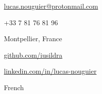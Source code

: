 \begin{TopBar}{\ColorTextSide}
  \vspace{0.35cm}

  \vspace{-0.35cm}
  \begin{multicols}{2}
    \begin{ItemList}{\ColorHighlight}
      \item [\Large\faAt]\href{mailto:lucas.nouguier@protonmail.com}{lucas.nouguier@protonmail.com}
      \item [\Large\faPhone] +33 7 81 76 81 96
      \item [\Large\faHome] Montpellier, France
      \columnbreak%
      \item [\Large\faGithub] \href{https://github.com/iusildra}{github.com/iusildra}
      \item [\Large\faLinkedinIn] \href{https://www.linkedin.com/in/lucas-nouguier/}{linkedin.com/in/lucas-nouguier}
      \item [\Large\faLanguage] French
    \end{ItemList}
  \end{multicols}
\end{TopBar}